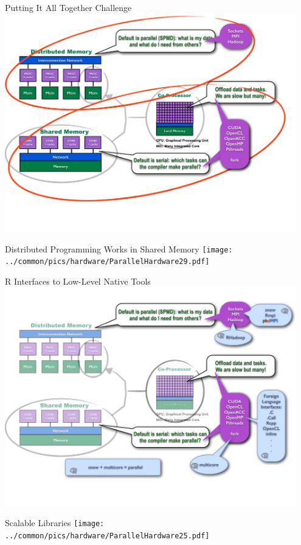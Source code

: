 \begin{frame}{Putting It All Together Challenge}
\includegraphics[width=0.95\textwidth]
{../common/pics/hardware/ParallelHardware9.pdf}
\end{frame}

\begin{frame}{Distributed Programming Works in Shared Memory}
\texttt{[image: ../common/pics/hardware/ParallelHardware29.pdf]}
\end{frame}

\begin{frame}{R Interfaces to Low-Level Native Tools}
\includegraphics[width=0.95\textwidth]
{../common/pics/hardware/ParallelHardware10.pdf}
\end{frame}

\begin{frame}{Scalable Libraries}
\texttt{[image: ../common/pics/hardware/ParallelHardware25.pdf]}
\end{frame}


